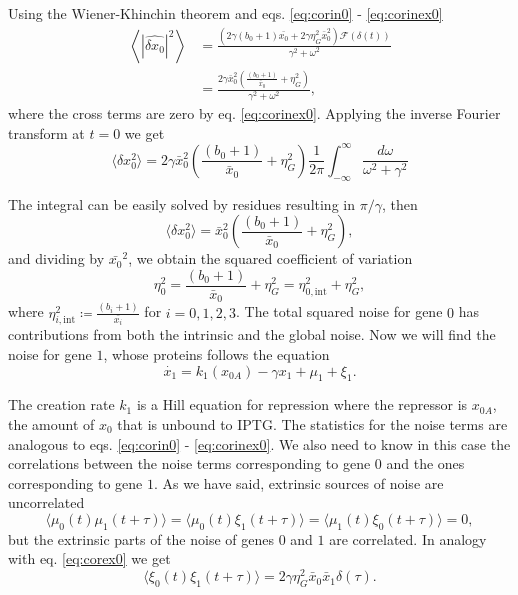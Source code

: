 Using the Wiener-Khinchin theorem and eqs. \eqref{eq:corin0} - \eqref{eq:corinex0}
\begin{equation}
  \label{eq:pgene0}
  \begin{split}
    \left\langle |\hat{\delta x_0}|^2 \right\rangle &= \frac{\left(2\gamma(b_0+1)\bar{x_0}+ 2\gamma\eta_G^2\bar{x}_0^2\right)\mathscr{F}(\delta(t))}{\gamma^2+\omega^2}\\
    &=\frac{2\gamma\bar{x}_0^2\left(\frac{(b_0+1)}{\bar{x}_0}+ \eta_G^2\right)}{\gamma^2+\omega^2},
  \end{split}
\end{equation}
where the cross terms are zero by eq. \eqref{eq:corinex0}. Applying the inverse Fourier transform at $t=0$ we get
\begin{equation*}
\langle \delta x_0^2 \rangle = 2\gamma\bar{x}_0^2\left(\frac{(b_0+1)}{\bar{x}_0}+ \eta_G^2\right)\frac{1}{2\pi}\int_{-\infty}^{\infty}\frac{d\omega}{\omega^2+\gamma^2}
\end{equation*}

The integral can be easily solved by residues resulting in $\pi/\gamma$, then
\begin{equation*}
\langle \delta x_0^2 \rangle = \bar{x}_0^2\left(\frac{(b_0+1)}{\bar{x}_0}+ \eta_G^2\right),
\end{equation*}
and dividing by $\bar{x_0}^2$, we obtain the squared coefficient of variation
\begin{equation}
  \label{eq:etagene0}
  \eta_0^2 = \frac{(b_0+1)}{\bar{x}_0}+ \eta_G^2 = \eta_{0,\text{int}}^2+\eta_G^2,
\end{equation}
where $\eta_{i,\text{int}}^2\coloneqq\frac{(b_i+1)}{\bar{x_i}}$ for $i=0,1,2,3$. The total squared noise for gene $0$ has contributions from both the intrinsic and the global noise. Now we will find the noise for gene $1$, whose proteins follows the equation
\begin{equation}
\label{eq:gene1}
\dot{x_1} = k_1(x_{0A})-\gamma x_1+\mu_1+\xi_1.
\end{equation}

The creation rate $k_1$ is a Hill equation for repression where the repressor is $x_{0A}$, the amount of $x_0$ that is unbound to IPTG. The statistics for the noise terms are analogous to eqs. \eqref{eq:corin0} - \eqref{eq:corinex0}. We also need to know in this case the correlations between the noise terms corresponding to gene $0$ and the ones corresponding to gene $1$. As we have said, extrinsic sources of noise are uncorrelated
\begin{equation}
\label{eq:corcross01}
\langle\mu_0(t)\mu_1(t+\tau)\rangle = \langle\mu_0(t)\xi_1(t+\tau)\rangle = \langle\mu_1(t)\xi_0(t+\tau)\rangle = 0,
\end{equation}
but the extrinsic parts of the noise of genes $0$ and $1$ are correlated. In analogy with eq. \eqref{eq:corex0} we get
\begin{equation*}
  \langle\xi_0(t)\xi_1(t+\tau)\rangle = 2\gamma\eta_G^2\bar{x}_0\bar{x}_1\delta(\tau).
\end{equation*}


